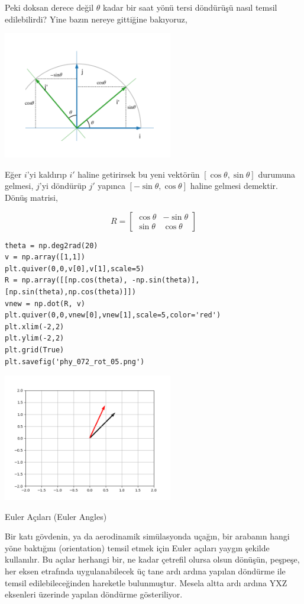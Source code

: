 \documentclass[12pt,fleqn]{article}\usepackage{../../common}
\begin{document}
Peki doksan derece değil $\theta$ kadar bir saat yönü tersi döndürüşü
nasıl temsil edilebilirdi? Yine bazın nereye gittiğine bakıyoruz,

\includegraphics[width=20em]{phy_072_rot_03.png}

Eğer $i$'yi kaldırıp $i'$ haline getirirsek bu yeni vektörün
$[\cos\theta,\sin\theta]$ durumuna gelmesi, $j$'yi döndürüp $j'$ yapınca
$[-\sin\theta,\cos\theta]$ haline gelmesi demektir. Dönüş matrisi,

$$
R = \left[\begin{array}{rr}
\cos\theta & -\sin\theta \\
\sin\theta & \cos\theta
\end{array}\right]
$$

\begin{verbatim}
theta = np.deg2rad(20)
v = np.array([1,1])
plt.quiver(0,0,v[0],v[1],scale=5)
R = np.array([[np.cos(theta), -np.sin(theta)],[np.sin(theta),np.cos(theta)]])
vnew = np.dot(R, v)
plt.quiver(0,0,vnew[0],vnew[1],scale=5,color='red')
plt.xlim(-2,2)
plt.ylim(-2,2)
plt.grid(True)
plt.savefig('phy_072_rot_05.png')
\end{verbatim}

\includegraphics[width=20em]{phy_072_rot_05.png}

Euler Açıları (Euler Angles)

Bir katı gövdenin, ya da aerodinamik simülasyonda uçağın, bir arabanın hangi
yöne baktığını (orientation) temsil etmek için Euler açıları yaygın şekilde
kullanılır. Bu açılar herhangi bir, ne kadar çetrefil olursa olsun dönüşün,
peşpeşe, her eksen etrafında uygulanabilecek üç tane ardı ardına yapılan
döndürme ile temsil edilebileceğinden hareketle bulunmuştur. Mesela altta ardı
ardına YXZ eksenleri üzerinde yapılan döndürme gösteriliyor.
\end{document}
